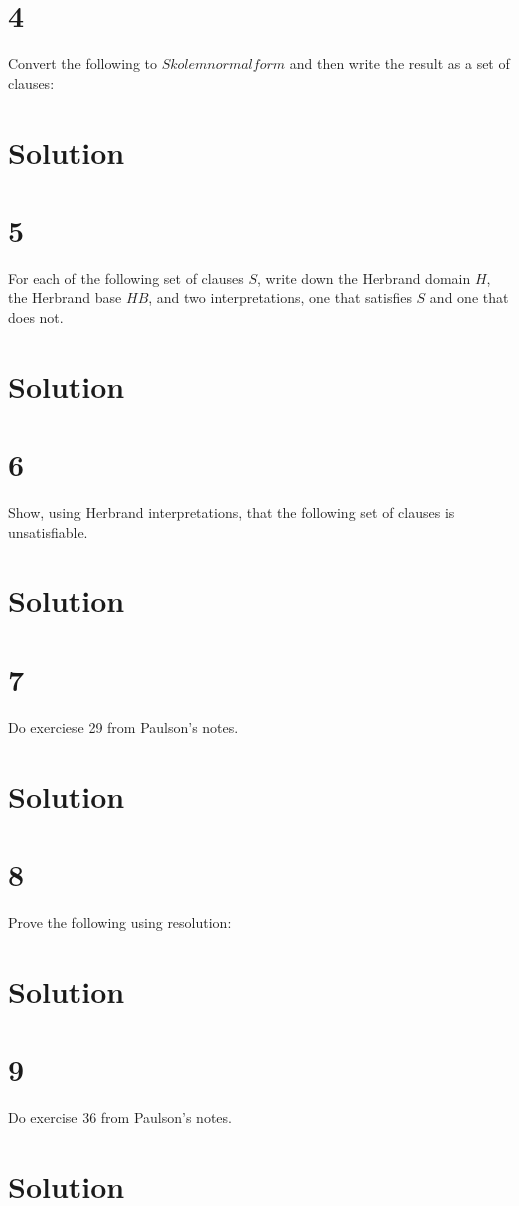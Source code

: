 \documentclass[10pt]{article}
\begin{document}
\section*{4}
Convert the following to $Skolem normal form$ and then write the result as a set of clauses:
\section*{Solution}

\section*{5}
For each of the following set of clauses $S$, write down the Herbrand domain $H$, the Herbrand base $HB$, and two interpretations, one that satisfies $S$ and one that does not.

\section*{Solution}


\section*{6}
Show, using Herbrand interpretations, that the following set of clauses is unsatisfiable.

\section*{Solution} 

\section*{7}
Do exerciese 29 from Paulson's notes.
\section*{Solution} 

\section*{8}
Prove the following using resolution:

\section*{Solution} 

\section*{9}
Do exercise 36 from Paulson's notes.

\section*{Solution} 
\end{document}

